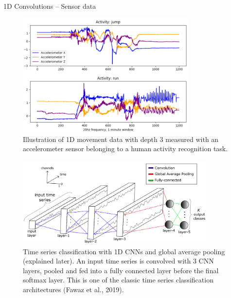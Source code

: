 \begin{vbframe}{1D Convolutions -- Sensor data}
    \begin{figure}
        \centering
        \includegraphics[width=9cm]{plots/05_conv_variations/1d/HAR.png}
        \caption{Illustration of 1D movement data with depth $3$ measured with an accelerometer sensor belonging to a human activity recognition task. }
    \end{figure}
\framebreak
    \begin{figure}
        \centering
        \includegraphics[width=10cm]{plots/05_conv_variations/1d/deep_tsc.png}
        \caption{Time series classification with 1D CNNs and global average pooling (explained later). An input time series is convolved with 3 CNN layers, pooled and fed into a fully connected layer before the final softmax layer. This is one of the classic time series classification architectures (Fawaz et al., 2019).}
    \end{figure}
\end{vbframe}

